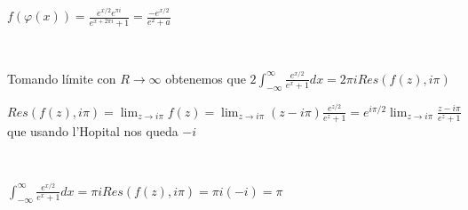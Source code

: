 $f(\varphi(x)) = \frac{e^{x/2}e^{\pi i}}{e^{x+2\pi i}+1} = \frac{-e^{x/2}}{e^2+a}$

\

Tomando límite con $R\rightarrow\infty$ obtenemos que
$2\int_{-\infty}^{\infty} \frac{e^{x/2}}{e^x+1} dx = 2\pi iRes(f(z),i\pi)$

$Res(f(z),i\pi) = \lim_{z\rightarrow i\pi} f(z) = \lim_{z\rightarrow i\pi} (z-i\pi) \frac{e^{z/2}}{e^z+1} = e^{i\pi/2} \lim_{z\rightarrow i\pi} \frac{z-i\pi}{e^z+1}$
que usando l'Hopital nos queda
$-i$

\

$\int_{-\infty}^{\infty} \frac{e^{x/2}}{e^x+1} dx = \pi iRes(f(z),i\pi) = \pi i(-i) = \pi $

